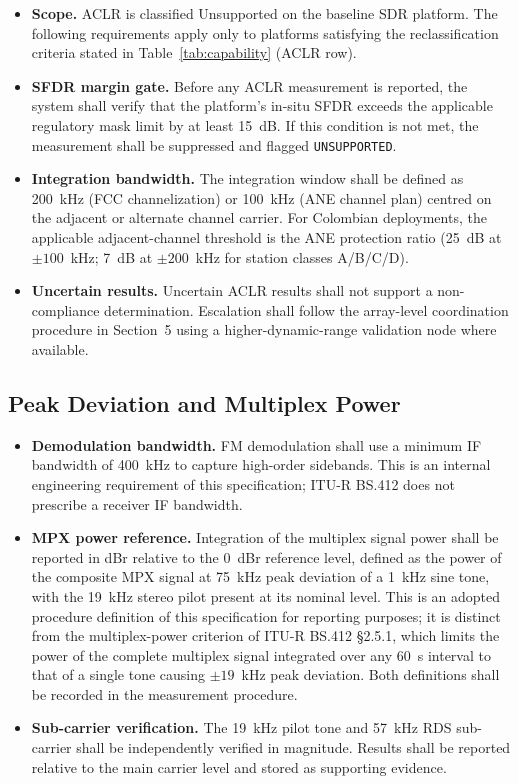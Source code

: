 \documentclass[11pt]{article}
\begin{document}
\begin{itemize}
    \item \textbf{Scope.} ACLR is classified Unsupported on the baseline SDR platform. The following requirements apply only to platforms satisfying the reclassification criteria stated in Table~\ref{tab:capability} (ACLR row).
    \item \textbf{SFDR margin gate.} Before any ACLR measurement is reported, the system shall verify that the platform's in-situ SFDR exceeds the applicable regulatory mask limit by at least 15~dB. If this condition is not met, the measurement shall be suppressed and flagged \texttt{UNSUPPORTED}.
    \item \textbf{Integration bandwidth.} The integration window shall be defined as 200~kHz (FCC channelization) or 100~kHz (ANE channel plan) centred on the adjacent or alternate channel carrier. For Colombian deployments, the applicable adjacent-channel threshold is the ANE protection ratio (25~dB at $\pm 100$~kHz; 7~dB at $\pm 200$~kHz for station classes A/B/C/D).
    \item \textbf{Uncertain results.} Uncertain ACLR results shall not support a non-compliance determination. Escalation shall follow the array-level coordination procedure in Section~5 using a higher-dynamic-range validation node where available.
\end{itemize}

\subsection*{Peak Deviation and Multiplex Power}

\begin{itemize}
    \item \textbf{Demodulation bandwidth.} FM demodulation shall use a minimum IF bandwidth of 400~kHz to capture high-order sidebands. This is an internal engineering requirement of this specification; ITU-R BS.412 does not prescribe a receiver IF bandwidth.
    \item \textbf{MPX power reference.} Integration of the multiplex signal power shall be reported in dBr relative to the 0~dBr reference level, defined as the power of the composite MPX signal at 75~kHz peak deviation of a 1~kHz sine tone, with the 19~kHz stereo pilot present at its nominal level. This is an adopted procedure definition of this specification for reporting purposes; it is distinct from the multiplex-power criterion of ITU-R BS.412 \S2.5.1, which limits the power of the complete multiplex signal integrated over any 60~s interval to that of a single tone causing $\pm 19$~kHz peak deviation. Both definitions shall be recorded in the measurement procedure.
    \item \textbf{Sub-carrier verification.} The 19~kHz pilot tone and 57~kHz RDS sub-carrier shall be independently verified in magnitude. Results shall be reported relative to the main carrier level and stored as supporting evidence.
\end{itemize}
\end{document}
